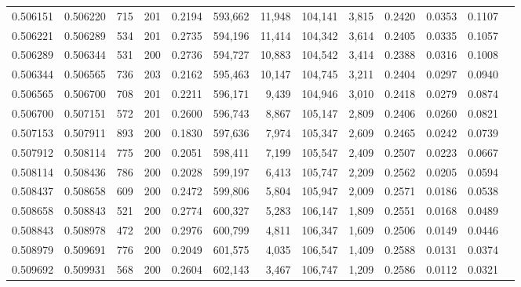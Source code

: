 \begin{tabular}{rrrrrrrrrrrrr}
0.506151 & 0.506220 &   715 & 201 &                                     0.2194 & 593,662 &  11,948 & 104,141 &   3,815 & 0.2420 & 0.0353 & 0.1107 \\
0.506221 & 0.506289 &   534 & 201 &                                     0.2735 & 594,196 &  11,414 & 104,342 &   3,614 & 0.2405 & 0.0335 & 0.1057 \\
0.506289 & 0.506344 &   531 & 200 &                                     0.2736 & 594,727 &  10,883 & 104,542 &   3,414 & 0.2388 & 0.0316 & 0.1008 \\
0.506344 & 0.506565 &   736 & 203 &                                     0.2162 & 595,463 &  10,147 & 104,745 &   3,211 & 0.2404 & 0.0297 & 0.0940 \\
0.506565 & 0.506700 &   708 & 201 &                                     0.2211 & 596,171 &   9,439 & 104,946 &   3,010 & 0.2418 & 0.0279 & 0.0874 \\
0.506700 & 0.507151 &   572 & 201 &                                     0.2600 & 596,743 &   8,867 & 105,147 &   2,809 & 0.2406 & 0.0260 & 0.0821 \\
0.507153 & 0.507911 &   893 & 200 &                                     0.1830 & 597,636 &   7,974 & 105,347 &   2,609 & 0.2465 & 0.0242 & 0.0739 \\
0.507912 & 0.508114 &   775 & 200 &                                     0.2051 & 598,411 &   7,199 & 105,547 &   2,409 & 0.2507 & 0.0223 & 0.0667 \\
0.508114 & 0.508436 &   786 & 200 &                                     0.2028 & 599,197 &   6,413 & 105,747 &   2,209 & 0.2562 & 0.0205 & 0.0594 \\
0.508437 & 0.508658 &   609 & 200 &                                     0.2472 & 599,806 &   5,804 & 105,947 &   2,009 & 0.2571 & 0.0186 & 0.0538 \\
0.508658 & 0.508843 &   521 & 200 &                                     0.2774 & 600,327 &   5,283 & 106,147 &   1,809 & 0.2551 & 0.0168 & 0.0489 \\
0.508843 & 0.508978 &   472 & 200 &                                     0.2976 & 600,799 &   4,811 & 106,347 &   1,609 & 0.2506 & 0.0149 & 0.0446 \\
0.508979 & 0.509691 &   776 & 200 &                                     0.2049 & 601,575 &   4,035 & 106,547 &   1,409 & 0.2588 & 0.0131 & 0.0374 \\
0.509692 & 0.509931 &   568 & 200 &                                     0.2604 & 602,143 &   3,467 & 106,747 &   1,209 & 0.2586 & 0.0112 & 0.0321 \\

\end{tabular}
